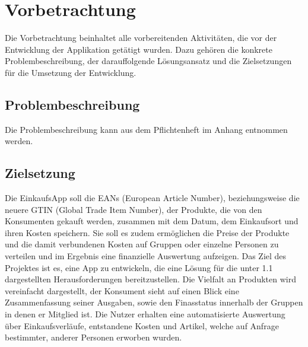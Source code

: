\documentclass[12pt,a4paper]{article}
\begin{document}
\newpage
\section{Vorbetrachtung}
Die Vorbetrachtung beinhaltet alle vorbereitenden Aktivitäten, die vor der Entwicklung der Applikation getätigt wurden. Dazu gehören die konkrete Problembeschreibung, der darauffolgende Lösungsansatz und die Zielsetzungen für die Umsetzung der Entwicklung.


\subsection{Problembeschreibung}

Die Problembeschreibung kann aus dem Pflichtenheft im Anhang entnommen werden.


\subsection{Zielsetzung}
Die EinkaufsApp soll die EANs (European Article Number), beziehungsweise die neuere GTIN (Global Trade Item Number), der Produkte, die von den Konsumenten gekauft werden, zusammen mit dem Datum, dem Einkaufsort und ihren Kosten speichern.
Sie soll es zudem ermöglichen die Preise der Produkte und die damit verbundenen Kosten auf Gruppen oder einzelne Personen zu verteilen und im Ergebnis eine finanzielle Auswertung aufzeigen.
Das Ziel des Projektes ist es, eine App zu entwickeln, die eine Lösung für die unter 1.1 dargestellten Herausforderungen bereitzustellen. 
Die Vielfalt an Produkten wird vereinfacht dargestellt, der Konsument sieht auf einen Blick eine Zusammenfassung seiner Ausgaben, sowie den Finasstatus innerhalb der Gruppen in denen er Mitglied ist. Die Nutzer erhalten eine automatisierte Auswertung über Einkaufsverläufe, entstandene Kosten und Artikel, welche auf Anfrage bestimmter, anderer Personen erworben wurden.
\end{document}
